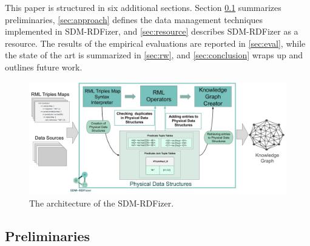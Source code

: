 This paper is structured in six additional sections. Section \ref{sec:pre} summarizes preliminaries, \autoref{sec:approach} defines the data management techniques implemented in SDM-RDFizer, and \autoref{sec:resource} describes SDM-RDFizer as a resource. The results of the empirical evaluations are reported in \autoref{sec:eval}, while the state of the art is summarized in \autoref{sec:rw}, and \autoref{sec:conclusion} wraps up and outlines future work.    
\begin{figure}[t!]
    \centering
    \includegraphics[width=1\textwidth]{figures/architecture_v1.1.jpg}
    \caption{The architecture of the SDM-RDFizer.}
    \label{fig:architecture}
\end{figure}
\subsection{Preliminaries}
\label{sec:pre}
